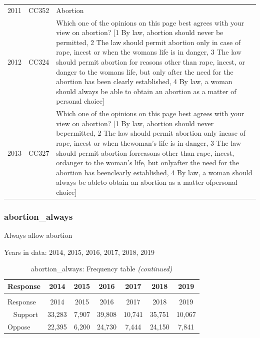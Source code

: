 \documentclass[12pt]{article}
\begin{document}
\begin{longtable}[t]{rl>{\raggedright\arraybackslash}p{10cm}}
2011 & CC352 & Abortion\\
2012 & CC324 & Which one of the opinions on this page best agrees with your view on abortion? [1 By law, abortion should never be permitted, 2 The law should permit abortion only in case of rape, incest or when the womans life is in danger, 3 The law should permit abortion for reasons other than rape, incest, or danger to the womans life, but only after the need for the abortion has been clearly established, 4 By law, a woman should always be able to obtain an abortion as a matter of personal choice]\\
2013 & CC327 & Which one of the opinions on this page best agrees with your view on abortion? [1 By law, abortion should never bepermitted, 2 The law should permit abortion only incase of rape, incest or when thewoman's life is in danger, 3 The law should permit abortion forreasons other than rape, incest, ordanger to the woman's life, but onlyafter the need for the abortion has beenclearly established, 4 By law, a woman should always be ableto obtain an abortion as a matter ofpersonal choice]\\*
\end{longtable}

\subsubsection{abortion\_always}\label{abortion_always}

Always allow abortion

Years in data: 2014, 2015, 2016, 2017, 2018,
2019\begingroup\fontsize{10}{12}\selectfont

\begin{longtable}[t]{lcccccc}
\caption{\label{tab:unnamed-chunk-4}abortion\_always: Frequency table}\\
\toprule
Response & 2014 & 2015 & 2016 & 2017 & 2018 & 2019\\
\midrule
\endfirsthead
\caption[]{abortion\_always: Frequency table \textit{(continued)}}\\
\toprule
Response & 2014 & 2015 & 2016 & 2017 & 2018 & 2019\\
\midrule
\endhead
\
\endfoot
\bottomrule
\endlastfoot
Support & 33,283 & 7,907 & 39,808 & 10,741 & 35,751 & 10,067\\
Oppose & 22,395 & 6,200 & 24,730 & 7,444 & 24,150 & 7,841\\*
\end{longtable}

\endgroup{}
\end{document}
